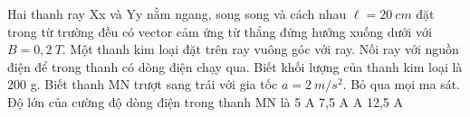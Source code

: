 \begin{vidu} %
Hai thanh ray Xx và Yy nằm ngang, song song và cách nhau $\ell = 20\ cm$ đặt trong từ trường đều có vector cảm ứng từ thẳng đứng hướng xuống dưới với $B = 0,2\ T$. Một thanh kim loại đặt trên ray vuông góc với ray. Nối ray với nguồn điện để trong thanh có dòng điện chạy qua. Biết khối lượng của thanh kim loại là 200 g. Biết thanh MN trượt sang trái với gia tốc $a = 2\ m/s^2$. Bỏ qua mọi ma sát. Độ lớn của cường độ dòng điện trong thanh MN là
\choice
{5 A}
{7,5 A}
{ A}
{12,5 A}
\end{vidu}
